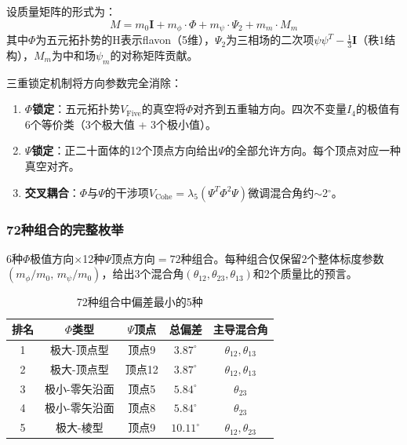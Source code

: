 设质量矩阵的形式为：
\begin{equation}
M = m_0 \mathbf{I} + m_\phi \cdot \Phi + m_\psi \cdot \Psi_2 + m_m \cdot M_m
\label{eq:mass_matrix_flavor}
\end{equation}
其中$\Phi$为五元拓扑势的H表示flavon（5维），$\Psi_2$为三相场的二次项$\psi\psi^T - \frac{1}{3}\mathbf{I}$（秩1结构），$M_m$为中和场$\psi_m$的对称矩阵贡献。

三重锁定机制将方向参数完全消除：

\begin{enumerate}
\item \textbf{$\Phi$锁定}：五元拓扑势$V_{\text{Five}}$的真空将$\Phi$对齐到五重轴方向。四次不变量$I_4$的极值有6个等价类（3个极大值 + 3个极小值）。
\item \textbf{$\Psi$锁定}：正二十面体的12个顶点方向给出$\Psi$的全部允许方向。每个顶点对应一种真空对齐。
\item \textbf{交叉耦合}：$\Phi$与$\Psi$的干涉项$V_{\text{Cohe}} = \lambda_5 (\Psi^T \Phi^2 \Psi)$微调混合角约$\sim$2$^\circ$。
\end{enumerate}

\subsubsection{72种组合的完整枚举}

6种$\Phi$极值方向$\times$12种$\Psi$顶点方向$=72$种组合。每种组合仅保留2个整体标度参数$(m_\phi/m_0, \, m_\psi/m_0)$，给出3个混合角$(\theta_{12}, \theta_{23}, \theta_{13})$和2个质量比的预言。

\begin{table}[htbp]
\centering
\caption{72种组合中偏差最小的5种}
\label{tab:72_combos}
\begin{tabular}{ccccc}
\hline
排名 & $\Phi$类型 & $\Psi$顶点 & 总偏差 & 主导混合角 \\
\hline
1 & 极大-顶点型 & 顶点9 & $3.87^\circ$ & $\theta_{12},\theta_{13}$ \\
2 & 极大-顶点型 & 顶点12 & $3.87^\circ$ & $\theta_{12},\theta_{13}$ \\
3 & 极小-零矢沿面 & 顶点5 & $5.84^\circ$ & $\theta_{23}$ \\
4 & 极小-零矢沿面 & 顶点8 & $5.84^\circ$ & $\theta_{23}$ \\
5 & 极大-棱型 & 顶点9 & $10.11^\circ$ & $\theta_{12},\theta_{23}$ \\
\hline
\end{tabular}
\end{table}

